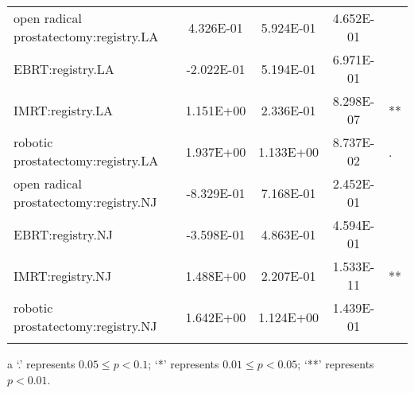 \documentclass[12pt]{article}
\begin{document}
{\begin{longtable}{lcccl}
  open radical prostatectomy:registry.LA & 4.326E-01 & 5.924E-01 & 4.652E-01 &  \\ 
  EBRT:registry.LA & -2.022E-01 & 5.194E-01 & 6.971E-01 &  \\ 
  IMRT:registry.LA & 1.151E+00 & 2.336E-01 & 8.298E-07 & ** \\ 
   robotic prostatectomy:registry.LA & 1.937E+00 & 1.133E+00 & 8.737E-02 & . \\ 
  open radical prostatectomy:registry.NJ & -8.329E-01 & 7.168E-01 & 2.452E-01 &  \\ 
  EBRT:registry.NJ & -3.598E-01 & 4.863E-01 & 4.594E-01 &  \\ 
  IMRT:registry.NJ & 1.488E+00 & 2.207E-01 & 1.533E-11 & ** \\ 
   robotic prostatectomy:registry.NJ & 1.642E+00 & 1.124E+00 & 1.439E-01 &  \\ 
   \hline
\hline
\label{ALongTable}
\end{longtable}
\begin{tablenotes}
\item[a]\small{`.' represents $0.05 \leq p < 0.1$;  `*' represents $0.01 \leq p < 0.05$; `**' represents $p < 0.01$.}
\end{tablenotes}
}
\end{document}
